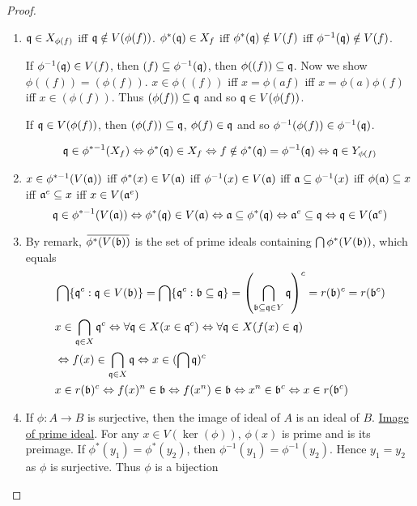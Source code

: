 \documentclass[11pt]{article}
\begin{document}
\begin{proof}
\begin{enumerate}
\item \(\mathfrak{q}\in X_{\phi(f)}\) iff \(\mathfrak{q}\notin V(\phi(f))\).  \(\phi^*(\mathfrak{q})\in X_f\) iff \(\phi^*(\mathfrak{q})\notin V(f)\)
iff \(\phi^{-1}(\mathfrak{q})\notin V(f)\).

If \(\phi^{-1}(\mathfrak{q})\in V(f)\), then \((f)\subseteq\phi^{-1}(\mathfrak{q})\), then \(\phi((f))\subseteq\mathfrak{q}\).
Now we show \(\phi((f))=(\phi(f))\). \(x\in\phi((f))\) iff \(x=\phi(af)\) iff \(x=\phi(a)\phi(f)\)
iff \(x\in(\phi(f))\). Thus \((\phi(f))\subseteq\mathfrak{q}\) and so \(\mathfrak{q}\in V(\phi(f))\).

If \(\mathfrak{q}\in V(\phi(f))\), then \((\phi(f))\subseteq\mathfrak{q}\), \(\phi(f)\in\mathfrak{q}\) and so \(\phi^{-1}(\phi(f))\in\phi^{-1}(\mathfrak{q})\).

\begin{equation*}
\mathfrak{q}\in\phi^{* -1 }(X_f)\Leftrightarrow\phi^*(\mathfrak{q})\in X_f\Leftrightarrow f\notin\phi^*(\mathfrak{q})=\phi^{-1}(\mathfrak{q})\Leftrightarrow\mathfrak{q}\in Y_{\phi(f)}
\end{equation*}
\item \(x\in\phi^{*-1}(V(\mathfrak{a}))\) iff \(\phi^*(x)\in V(\mathfrak{a})\) iff \(\phi^{-1}(x)\in V(\mathfrak{a})\) iff \(\mathfrak{a}\subseteq\phi^{-1}(x)\)
iff \(\phi(\mathfrak{a})\subseteq x\) iff \(\mathfrak{a}^e\subseteq x\) iff \(x\in V(\mathfrak{a}^e)\)
\begin{equation*}
 \mathfrak{q}\in\phi^{* -1}(V(\mathfrak{a}))\Leftrightarrow\phi^*(\mathfrak{q})\in V(\mathfrak{a})\Leftrightarrow\mathfrak{a}\subseteq\phi^*(\mathfrak{q})\Leftrightarrow\mathfrak{a}^e\subseteq\mathfrak{q}\Leftrightarrow\mathfrak{q}\in V(\mathfrak{a}^e)
\end{equation*}
\item By remark, \(\bbar{\phi^*(V(\fb))}\) is the set of prime ideals containing \(\bigcap\phi^*(V(\mathfrak{b}))\), which
equals
\begin{align*}
&\bigcap\{\mathfrak{q}^c:\mathfrak{q}\in V(\mathfrak{b})\}=\bigcap\{\mathfrak{q}^c:\mathfrak{b}\subseteq\mathfrak{q}\}=\left( \bigcap_{\mathfrak{b}\subseteq\mathfrak{q}\in Y}\mathfrak{q} \right)^c=r(\mathfrak{b})^c=r(\mathfrak{b}^c)\\
&x\in\bigcap_{\mathfrak{q}\in X}\mathfrak{q}^c\Leftrightarrow\forall\mathfrak{q}\in X(x\in\mathfrak{q}^c)\Leftrightarrow\forall\mathfrak{q}\in X(f(x)\in\mathfrak{q})\\&\Leftrightarrow f(x)\in\bigcap_{\mathfrak{q}\in X}\mathfrak{q}\Leftrightarrow x\in(\bigcap\mathfrak{q})^c\\
&x\in r(\mathfrak{b})^c\Leftrightarrow f(x)^n\in\mathfrak{b}\Leftrightarrow f(x^n)\in\mathfrak{b}\Leftrightarrow x^n\in\mathfrak{b}^c\Leftrightarrow x\in r(\mathfrak{b}^c)
\end{align*}
\item If \(\phi:A\to B\) is surjective, then the image of ideal of \(A\) is an ideal of \(B\). \href{https://math.stackexchange.com/questions/1805457/how-to-prove-that-the-image-of-a-prime-ideal-is-also-a-prime-ideal}{Image of
prime ideal}. For any \(x\in V(\ker(\phi))\), \(\phi(x)\) is prime and is its preimage.
If \(\phi^*(y_1)=\phi^*(y_2)\), then \(\phi^{-1}(y_1)=\phi^{-1}(y_2)\). Hence \(y_1=y_2\) as \(\phi\) is surjective.
Thus \(\phi\) is a bijection


\end{enumerate}
\end{proof}
\end{document}
